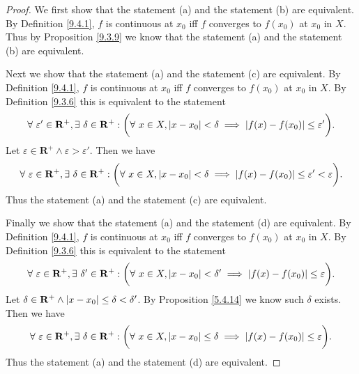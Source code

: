 \begin{proof}
    We first show that the statement (a) and the statement (b) are equivalent.
    By Definition \ref{9.4.1}, \(f\) is continuous at \(x_0\) iff \(f\) converges to \(f(x_0)\) at \(x_0\) in \(X\).
    Thus by Proposition \ref{9.3.9} we know that the statement (a) and the statement (b) are equivalent.

    Next we show that the statement (a) and the statement (c) are equivalent.
    By Definition \ref{9.4.1}, \(f\) is continuous at \(x_0\) iff \(f\) converges to \(f(x_0)\) at \(x_0\) in \(X\).
    By Definition \ref{9.3.6} this is equivalent to the statement
    \[
        \forall\ \varepsilon' \in \mathbf{R}^+, \exists\ \delta \in \mathbf{R}^+ : \bigg(\forall\ x \in X, \abs*{x - x_0} < \delta \implies \abs*{f(x) - f(x_0)} \leq \varepsilon'\bigg).
    \]
    Let \(\varepsilon \in \mathbf{R}^+ \land \varepsilon > \varepsilon'\).
    Then we have
    \[
        \forall\ \varepsilon \in \mathbf{R}^+, \exists\ \delta \in \mathbf{R}^+ : \bigg(\forall\ x \in X, \abs*{x - x_0} < \delta \implies \abs*{f(x) - f(x_0)} \leq \varepsilon' < \varepsilon\bigg).
    \]
    Thus the statement (a) and the statement (c) are equivalent.

    Finally we show that the statement (a) and the statement (d) are equivalent.
    By Definition \ref{9.4.1}, \(f\) is continuous at \(x_0\) iff \(f\) converges to \(f(x_0)\) at \(x_0\) in \(X\).
    By Definition \ref{9.3.6} this is equivalent to the statement
    \[
        \forall\ \varepsilon \in \mathbf{R}^+, \exists\ \delta' \in \mathbf{R}^+ : \bigg(\forall\ x \in X, \abs*{x - x_0} < \delta' \implies \abs*{f(x) - f(x_0)} \leq \varepsilon\bigg).
    \]
    Let \(\delta \in \mathbf{R}^+ \land \abs*{x - x_0} \leq \delta < \delta'\).
    By Proposition \ref{5.4.14} we know such \(\delta\) exists.
    Then we have
    \[
        \forall\ \varepsilon \in \mathbf{R}^+, \exists\ \delta \in \mathbf{R}^+ : \bigg(\forall\ x \in X, \abs*{x - x_0} \leq \delta \implies \abs*{f(x) - f(x_0)} \leq \varepsilon\bigg).
    \]
    Thus the statement (a) and the statement (d) are equivalent.
\end{proof}
